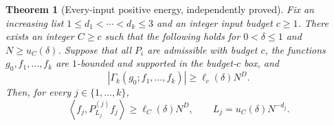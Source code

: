 \documentclass[11pt]{article}
\newtheorem{theorem}{Theorem}[section]
\theoremstyle{definition}
\begin{document}
\begin{theorem}[Every-input positive energy, independently proved]
\label{patch:energy-core}
Fix an increasing list $1\leq d_1<\cdots<d_k\leq3$ and an integer input budget $c\geq1$.
There exists an integer $C\geq c$ such that the following holds for $0<\delta\leq1$ and
$N\geq u_C(\delta)$.  Suppose that all $P_i$ are admissible with budget $c$, the functions
$g_0,f_1,\ldots,f_k$ are $1$-bounded and supported in the budget-$c$ box, and
\[
 |\Gamma_k(g_0;f_1,\ldots,f_k)|\geq\ell_c(\delta)N^D.
\]
Then, for every $j\in\{1,\ldots,k\}$,
\begin{equation}\label{patch:all-energy}
 \left\langle f_j,P_{L_j}^{(j)}f_j\right\rangle
      \geq\ell_C(\delta)N^D,
       \qquad L_j=u_C(\delta)N^{-d_j}.
\end{equation}
\end{theorem}
\end{document}
